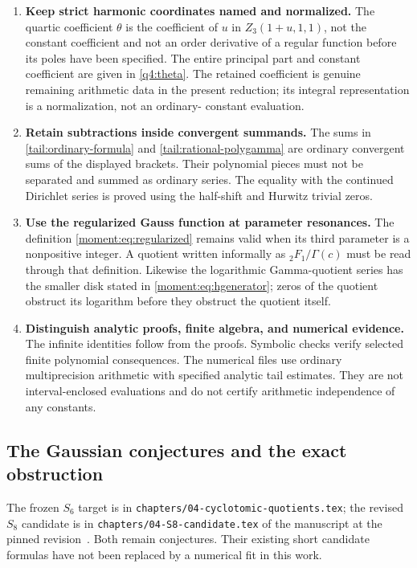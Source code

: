 \begin{enumerate}
\item \textbf{Keep strict harmonic coordinates named and normalized.}
The quartic coefficient $\theta$ is the coefficient of $u$ in
$Z_3(1+u,1,1)$, not the constant coefficient and not an order
derivative of a regular function before its poles have been
specified. The entire principal part and constant coefficient
are given in \eqref{q4:theta}. The retained coefficient is
genuine remaining arithmetic data in the present reduction;
its integral representation is a normalization, not an ordinary-
constant evaluation.

\item \textbf{Retain subtractions inside convergent summands.}
The sums in \eqref{tail:ordinary-formula} and
\eqref{tail:rational-polygamma} are ordinary convergent sums of
the displayed brackets. Their polynomial pieces must not be
separated and summed as ordinary series. The equality with the
continued Dirichlet series is proved using the half-shift and
Hurwitz trivial zeros.

\item \textbf{Use the regularized Gauss function at parameter resonances.}
The definition \eqref{moment:eq:regularized} remains valid when
its third parameter is a nonpositive integer. A quotient written
informally as ${}_2F_1/\Gamma(c)$ must be read through that
definition. Likewise the logarithmic Gamma-quotient series has
the smaller disk stated in \eqref{moment:eq:hgenerator}; zeros
of the quotient obstruct its logarithm before they obstruct
the quotient itself.

\item \textbf{Distinguish analytic proofs, finite algebra, and numerical evidence.}
The infinite identities follow from the proofs. Symbolic checks
verify selected finite polynomial consequences. The numerical
files use ordinary multiprecision arithmetic with specified
analytic tail estimates. They are not interval-enclosed evaluations
and do not certify arithmetic independence of any constants.
\end{enumerate}

\subsection{The Gaussian conjectures and the exact obstruction}

The frozen $S_6$ target is in
\texttt{chapters/04-cyclotomic-quotients.tex}; the revised $S_8$
candidate is in \texttt{chapters/04-S8-candidate.tex} of the
manuscript at the pinned revision~\cite{ProveIt}. Both remain
conjectures. Their existing short candidate formulas have not
been replaced by a numerical fit in this work.

